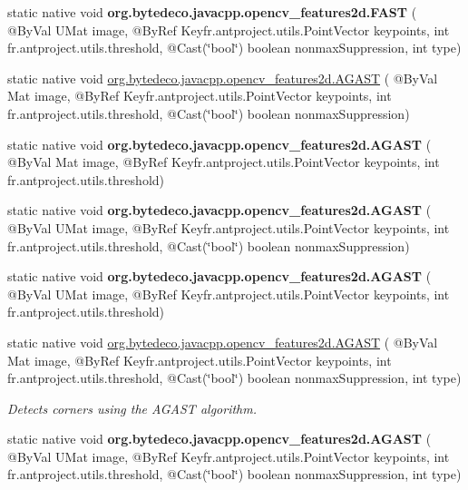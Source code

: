 \begin{DoxyCompactItemize}
static native void {\bfseries org.\+bytedeco.\+javacpp.\+opencv\+\_\+features2d.\+F\+A\+ST} ( @By\+Val U\+Mat image, @By\+Ref Key\+fr.antproject.utils.Point\+Vector keypoints, int fr.antproject.utils.threshold, @Cast(\char`\"{}bool\char`\"{}) boolean nonmax\+Suppression, int type)
\item 
static native void \hyperlink{group__features2d__main_ga849ee8acfb310ef13c3fd8a8f25327ed}{org.\+bytedeco.\+javacpp.\+opencv\+\_\+features2d.\+A\+G\+A\+ST} ( @By\+Val Mat image, @By\+Ref Key\+fr.antproject.utils.Point\+Vector keypoints, int fr.antproject.utils.threshold, @Cast(\char`\"{}bool\char`\"{}) boolean nonmax\+Suppression)
\item 
\mbox{\label{group__features2d__main_gaf22c6f99e6b9396740f6307a096af588}} 
static native void {\bfseries org.\+bytedeco.\+javacpp.\+opencv\+\_\+features2d.\+A\+G\+A\+ST} ( @By\+Val Mat image, @By\+Ref Key\+fr.antproject.utils.Point\+Vector keypoints, int fr.antproject.utils.threshold)
\item 
\mbox{\label{group__features2d__main_ga8117d36086a8026863c3a8efa69889f2}} 
static native void {\bfseries org.\+bytedeco.\+javacpp.\+opencv\+\_\+features2d.\+A\+G\+A\+ST} ( @By\+Val U\+Mat image, @By\+Ref Key\+fr.antproject.utils.Point\+Vector keypoints, int fr.antproject.utils.threshold, @Cast(\char`\"{}bool\char`\"{}) boolean nonmax\+Suppression)
\item 
\mbox{\label{group__features2d__main_ga7754d5ff319320963db994f854dd8184}} 
static native void {\bfseries org.\+bytedeco.\+javacpp.\+opencv\+\_\+features2d.\+A\+G\+A\+ST} ( @By\+Val U\+Mat image, @By\+Ref Key\+fr.antproject.utils.Point\+Vector keypoints, int fr.antproject.utils.threshold)
\item 
static native void \hyperlink{group__features2d__main_ga2126ee1b1b70316ae0fd6ffb3d2d51bc}{org.\+bytedeco.\+javacpp.\+opencv\+\_\+features2d.\+A\+G\+A\+ST} ( @By\+Val Mat image, @By\+Ref Key\+fr.antproject.utils.Point\+Vector keypoints, int fr.antproject.utils.threshold, @Cast(\char`\"{}bool\char`\"{}) boolean nonmax\+Suppression, int type)
\begin{DoxyCompactList}\small\item\em Detects corners using the A\+G\+A\+ST algorithm. \end{DoxyCompactList}\item 
\mbox{\label{group__features2d__main_gad2865f6a56af34b53c7e3ebb3abd2b6c}} 
static native void {\bfseries org.\+bytedeco.\+javacpp.\+opencv\+\_\+features2d.\+A\+G\+A\+ST} ( @By\+Val U\+Mat image, @By\+Ref Key\+fr.antproject.utils.Point\+Vector keypoints, int fr.antproject.utils.threshold, @Cast(\char`\"{}bool\char`\"{}) boolean nonmax\+Suppression, int type)
\end{DoxyCompactItemize}


